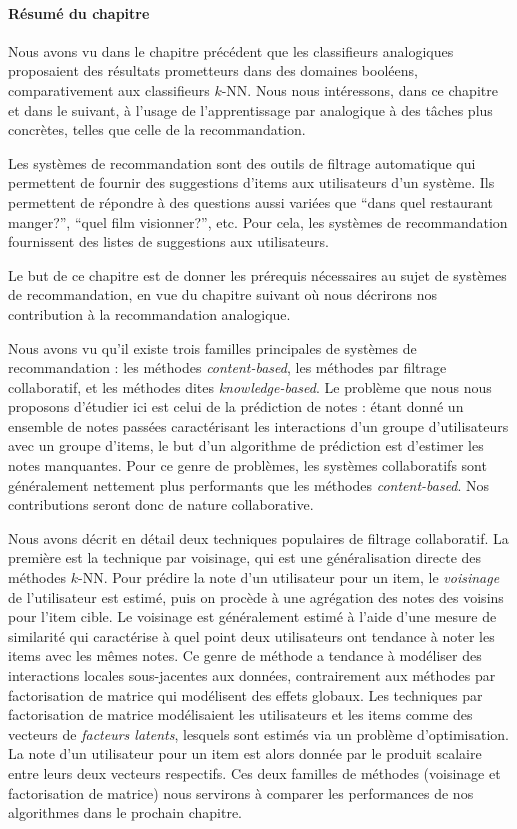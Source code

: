 \paragraph{Résumé du chapitre}

Nous avons vu dans le chapitre précédent que les classifieurs analogiques
proposaient des résultats prometteurs dans des domaines booléens,
comparativement aux classifieurs $k$-NN. Nous nous intéressons, dans ce
chapitre et dans le suivant, à l'usage de l'apprentissage par analogique à des
tâches plus concrètes, telles que celle de la recommandation.

Les systèmes de recommandation sont des outils de filtrage automatique qui
permettent de fournir des suggestions d'items aux utilisateurs d'un système.
Ils permettent de répondre à des questions aussi variées que ``dans quel
restaurant manger?'', ``quel film visionner?'', etc. Pour cela, les systèmes de
recommandation fournissent des listes de suggestions aux utilisateurs.

Le but de ce chapitre est de donner les prérequis nécessaires au sujet de
systèmes de recommandation, en vue du chapitre suivant où nous décrirons nos
contribution à la recommandation analogique.

Nous avons vu qu'il existe trois familles principales de systèmes de
recommandation : les méthodes \textit{content-based}, les méthodes par filtrage
collaboratif, et les méthodes dites \textit{knowledge-based}. Le problème que
nous nous proposons d'étudier ici est celui de la prédiction de notes : étant
donné un ensemble de notes passées caractérisant les interactions d'un groupe
d'utilisateurs avec un groupe d'items, le but d'un algorithme de prédiction est
d'estimer les notes manquantes. Pour ce genre de problèmes, les systèmes
collaboratifs sont généralement nettement plus performants que les méthodes
\textit{content-based}. Nos contributions seront donc de nature collaborative.

Nous avons décrit en détail deux techniques populaires de filtrage
collaboratif. La première est la technique par voisinage, qui est une
généralisation directe des méthodes $k$-NN. Pour prédire la note d'un
utilisateur pour un item, le \textit{voisinage} de l'utilisateur est estimé,
puis on procède à une agrégation des notes des voisins pour l'item cible. Le
voisinage est généralement estimé à l'aide d'une mesure de similarité qui
caractérise à quel point deux utilisateurs ont tendance à noter les items avec
les mêmes notes. Ce genre de méthode a tendance à  modéliser des interactions
locales sous-jacentes aux données, contrairement aux méthodes par factorisation
de matrice qui modélisent des effets globaux. Les techniques par factorisation
de matrice modélisaient les utilisateurs et les items comme des vecteurs de
\textit{facteurs latents}, lesquels sont estimés via un problème
d'optimisation. La note d'un utilisateur pour un item est alors donnée par le
produit scalaire entre leurs deux vecteurs respectifs. Ces deux familles de
méthodes (voisinage et factorisation de matrice) nous servirons à comparer les
performances de nos algorithmes dans le prochain chapitre.
